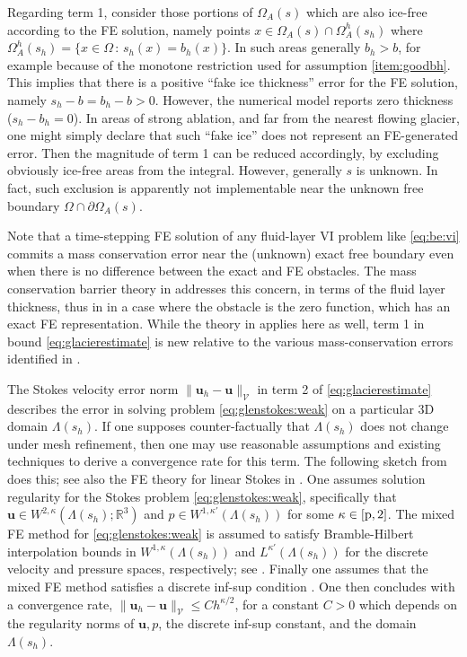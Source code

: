 \documentclass[hidelinks,onefignum,onetabnum,final]{siamart220329}  %
\newcommand{\RR}{\mathbb{R}}
\newcommand{\bu}{\mathbf{u}}
\newcommand{\cV}{\mathcal{V}}
\newcommand{\pp}{{\text{\textnormal{p}}}}
\begin{document}
Regarding term 1, consider those portions of $\Omega_A(s)$ which are also ice-free according to the FE solution, namely points $x \in \Omega_A(s) \cap \Omega_A^h(s_h)$ where $\Omega_A^h(s_h) = \{x\in\Omega\,:\,s_h(x)=b_h(x)\}$.  In such areas generally $b_h > b$, for example because of the monotone restriction used for assumption \ref{item:goodbh}.  This implies that there is a positive ``fake ice thickness'' error for the FE solution, namely $s_h - b=b_h-b>0$.  However, the numerical model reports zero thickness ($s_h-b_h=0$).  In areas of strong ablation, and far from the nearest flowing glacier, one might simply declare that such ``fake ice'' does not represent an FE-generated error.  Then the magnitude of term 1 can be reduced accordingly, by excluding obviously ice-free areas from the integral.  However, generally $s$ is unknown.  In fact, such exclusion is apparently not implementable near the unknown free boundary $\Omega \cap \partial \Omega_A(s)$.

Note that a time-stepping FE solution of any fluid-layer VI problem like \eqref{eq:be:vi} commits a mass conservation error near the (unknown) exact free boundary even when there is no difference between the exact and FE obstacles.  The mass conservation barrier theory in \cite{Bueler2021conservation} addresses this concern, in terms of the fluid layer thickness, thus in in a case where the obstacle is the zero function, which has an exact FE representation.  While the theory in \cite{Bueler2021conservation} applies here as well, term 1 in bound \eqref{eq:glacierestimate} is new relative to the various mass-conservation errors identified in \cite{Bueler2021conservation}.

The Stokes velocity error norm $\|\bu_h - \bu\|_{\cV}$ in term 2 of \eqref{eq:glacierestimate} describes the error in solving problem \eqref{eq:glenstokes:weak} on a particular 3D domain $\Lambda(s_h)$.  If one supposes counter-factually that $\Lambda(s_h)$ does not change under mesh refinement, then one may use reasonable assumptions and existing techniques to derive a convergence rate for this term.  The following sketch from \cite[Theorem 4.9]{JouvetRappaz2011} does this; see also the FE theory for linear Stokes in \cite{Elmanetal2014}.  One assumes solution regularity for the Stokes problem \eqref{eq:glenstokes:weak}, specifically that $\bu\in W^{2,\kappa}(\Lambda(s_h);\RR^3)$ and $p \in W^{1,\kappa'}(\Lambda(s_h))$ for some $\kappa \in [\pp,2]$.  The mixed FE method for \eqref{eq:glenstokes:weak} is assumed to satisfy Bramble-Hilbert interpolation bounds in $W^{1,\kappa}(\Lambda(s_h))$ and $L^{\kappa'}(\Lambda(s_h))$ for the discrete velocity and pressure spaces, respectively; see \cite[inequalities (4.26), (4.27)]{JouvetRappaz2011}.  Finally one assumes that the mixed FE method satisfies a discrete inf-sup condition \cite[equation (4.1)]{JouvetRappaz2011}.  One then concludes with a convergence rate, $\|\bu_h - \bu\|_{\cV} \le C h^{\kappa/2}$, for a constant $C>0$ which depends on the regularity norms of $\bu,p$, the discrete inf-sup constant, and the domain $\Lambda(s_h)$.
\end{document}
